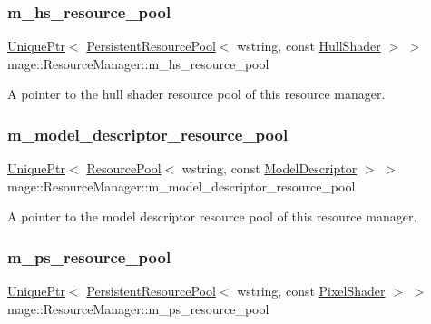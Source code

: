 \subsubsection{\texorpdfstring{m\+\_\+hs\+\_\+resource\+\_\+pool}{m\_hs\_resource\_pool}}
{\footnotesize\ttfamily \hyperlink{namespacemage_a3316d7143a973e37adf1110f2e80ca31}{Unique\+Ptr}$<$ \hyperlink{classmage_1_1_persistent_resource_pool}{Persistent\+Resource\+Pool}$<$ wstring, const \hyperlink{namespacemage_a964e5e384b0e55ac900c819da48b6000}{Hull\+Shader} $>$ $>$ mage\+::\+Resource\+Manager\+::m\+\_\+hs\+\_\+resource\+\_\+pool\hspace{0.3cm}{\ttfamily [private]}}

A pointer to the hull shader resource pool of this resource manager. \hypertarget{classmage_1_1_resource_manager_a57aab278f875724e43b48a9e9885ccea}{}\label{classmage_1_1_resource_manager_a57aab278f875724e43b48a9e9885ccea} 
\subsubsection{\texorpdfstring{m\+\_\+model\+\_\+descriptor\+\_\+resource\+\_\+pool}{m\_model\_descriptor\_resource\_pool}}
{\footnotesize\ttfamily \hyperlink{namespacemage_a3316d7143a973e37adf1110f2e80ca31}{Unique\+Ptr}$<$ \hyperlink{classmage_1_1_resource_pool}{Resource\+Pool}$<$ wstring, const \hyperlink{classmage_1_1_model_descriptor}{Model\+Descriptor} $>$ $>$ mage\+::\+Resource\+Manager\+::m\+\_\+model\+\_\+descriptor\+\_\+resource\+\_\+pool\hspace{0.3cm}{\ttfamily [private]}}

A pointer to the model descriptor resource pool of this resource manager. \hypertarget{classmage_1_1_resource_manager_ab271d7c35552e28b3b79cb10fea5cf72}{}\label{classmage_1_1_resource_manager_ab271d7c35552e28b3b79cb10fea5cf72} 
\subsubsection{\texorpdfstring{m\+\_\+ps\+\_\+resource\+\_\+pool}{m\_ps\_resource\_pool}}
{\footnotesize\ttfamily \hyperlink{namespacemage_a3316d7143a973e37adf1110f2e80ca31}{Unique\+Ptr}$<$ \hyperlink{classmage_1_1_persistent_resource_pool}{Persistent\+Resource\+Pool}$<$ wstring, const \hyperlink{namespacemage_a27ecaf266420ee7a494d64edc0757129}{Pixel\+Shader} $>$ $>$ mage\+::\+Resource\+Manager\+::m\+\_\+ps\+\_\+resource\+\_\+pool\hspace{0.3cm}{\ttfamily [private]}}


